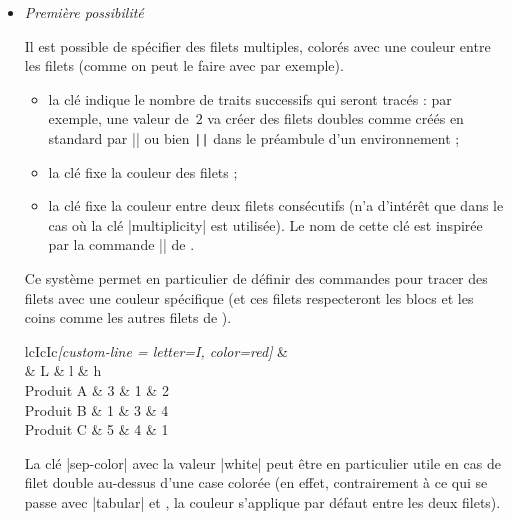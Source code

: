 \documentclass[dvipsnames]{article}
\begin{document}
\begin{itemize}[beginpenalty=10000]
\item \emph{Première possibilité}

\nobreak
Il est possible de spécifier des filets multiples, colorés avec une couleur
entre les filets (comme on peut le faire avec  par exemple).

\begin{itemize}
\item la clé  indique le nombre de traits successifs
qui seront tracés : par exemple, une valeur de~$2$ va créer des filets doubles
comme créés en standard par |\hline\hline| ou bien \verb+||+ dans le préambule
d'un environnement ;

\item la clé  fixe la couleur des filets ;

\item la clé  fixe la couleur entre deux filets consécutifs (n'a
d'intérêt que dans le cas où la clé |multiplicity| est utilisée). Le nom de
cette clé est inspirée par la commande |\doublerulesepcolor| de .
\end{itemize}

\medskip
Ce système permet en particulier de définir des commandes pour tracer des filets
avec une couleur spécifique (et ces filets respecteront les blocs et les coins
comme les autres filets de ).

\medskip
\begin{Code}
\begin{NiceTabular}{lcIcIc}\emph{[custom-line = {letter=I, color=red}]}
\Hline
          &  \\
          & L & l & h \\
\Hline
Produit A & 3 & 1 & 2 \\
Produit B & 1 & 3 & 4 \\
Produit C & 5 & 4 & 1 \\
\Hline
\end{NiceTabular}
\end{Code}


\bigskip
La clé |sep-color| avec la valeur |white| peut être en particulier utile en cas
de filet double au-dessus d'une case colorée (en effet, contrairement à ce qui se passe
avec |{tabular}| et , la couleur s'applique par défaut entre les deux filets).


\end{itemize}
\end{document}
